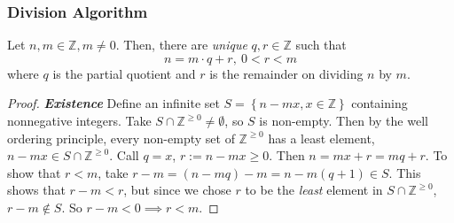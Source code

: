 \documentclass{article}
\newcommand{\Z}{\mathbb{Z}}
\newcommand{\textib}[1]{\textit{\textbf{{#1}}}}
\newcommand{\theorem}[1]{\begin{tcolorbox}[title=Theorem]{#1}\end{tcolorbox}}
\begin{document}
\subsubsection{Division Algorithm}
\theorem{
    Let $n, m \in \Z, m \neq 0$. Then, there are \textit{unique} $q, r \in \Z$ such that 
    \[n = m \cdot q + r, \ 0 < r < m\]
    where $q$ is the partial quotient and $r$ is the remainder on dividing $n$ by $m$.
}
\begin{proof}
    \textib{Existence}
    Define an infinite set $S = \left\{ n - mx, x \in \Z \right\}$ containing nonnegative integers.
    Take $S \cap \Z^{\geq 0} \neq \emptyset$, so $S$ is non-empty. Then by the well ordering 
    principle, every non-empty set of $\Z^{\geq 0}$ has a least element, $n - mx \in S \cap \Z^{\geq 0}$.
    Call $q = x$, $r := n - mx \geq 0$. Then $n = mx + r = mq + r$. To show that $r < m$, take
    $r - m = (n - mq) - m = n - m(q + 1) \in S$. This shows that $r - m < r$, but since we chose
    $r$ to be the \textit{least} element in $S \cap \Z^{\geq 0}$, $r - m \not\in S$. So $r - m < 0
    \implies r < m$.
\end{proof}
\end{document}
